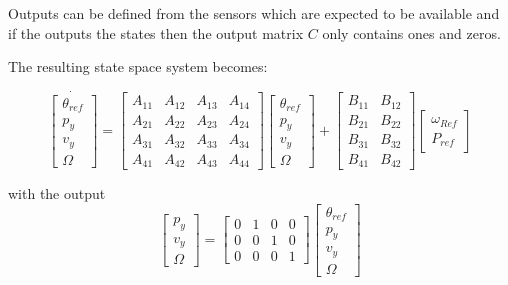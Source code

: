\smallskip
Outputs can be defined from the sensors which are expected to be available and if the outputs the states then the output matrix $ C $ only contains ones and zeros.

The resulting state space system becomes:

\begin{equation}\label{eq:xdot}
	\dot{\begin{bmatrix} \theta_{ref} \\
						p_y \\ 
						v_y \\
						\Omega \end{bmatrix}} = 
	\begin{bmatrix} A_{11} & A_{12} & A_{13} & A_{14}\\ 
					A_{21} & A_{22} & A_{23} & A_{24}\\ 
					A_{31} & A_{32} & A_{33} & A_{34}\\
					A_{41} & A_{42} & A_{43} & A_{44}\end{bmatrix}
	\begin{bmatrix} \theta_{ref} \\
					p_y \\ 
					v_y \\
					\Omega \end{bmatrix} + 
	\begin{bmatrix} B_{11} & B_{12} \\
					B_{21} & B_{22} \\
					B_{31} & B_{32} \\
					B_{41} & B_{42} \end{bmatrix}
	\begin{bmatrix} \omega_{Ref} \\ 
					P_{ref} \end{bmatrix}
\end{equation}

with the output
\begin{equation}\label{eq:y}
	\begin{bmatrix} p_y \\ 
					v_y \\
					\Omega \end{bmatrix} = 
	\begin{bmatrix}	0 	& 1 	& 0 	& 0 \\ 
					0 	& 0 	& 1 	& 0 \\
					0 	& 0 	& 0 	& 1 \end{bmatrix}
	\begin{bmatrix} \theta_{ref} \\
					p_y \\ 
					v_y \\
					\Omega \end{bmatrix}
\end{equation}


